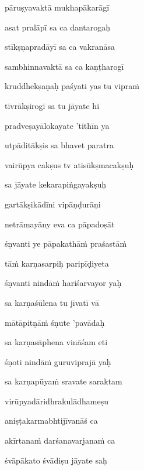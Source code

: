 \nemslokac 
pāruṣyavaktā mukhapākarāgī
\dontdisplaylinenum

\nemslokad 
asat pralāpī sa ca dantarogaḥ \veg\dontdisplaylinenum

\ujvers\nemsloka 
stīkṣṇapradāyī sa ca vakranāsa
\dontdisplaylinenum

\nemslokab 
sambhinnavaktā sa ca kaṇṭharogī \danda\dontdisplaylinenum

\nemslokac 
kruddhekṣaṇaḥ paśyati yas tu vipraṁ
\dontdisplaylinenum

\nemslokad 
tīvrākṣirogī sa tu jāyate hi \veg\dontdisplaylinenum

\ujvers\nemsloka 
pradveṣayālokayate 'tithīn ya
\dontdisplaylinenum

\nemslokab 
utpāditākṣis sa bhavet paratra \danda\dontdisplaylinenum

\nemslokac 
vairūpya cakṣus tv atisūkṣmacakṣuḥ
\dontdisplaylinenum

\nemslokad 
sa jāyate kekarapiṅgayakṣuḥ \veg\dontdisplaylinenum

\ujvers\nemsloka 
gartākṣikādīni vipāṇḍurāṇi
\dontdisplaylinenum

\nemslokab 
netrāmayāny eva ca pāpadoṣāt \danda\dontdisplaylinenum

\nemslokac 
śṇvanti ye pāpakathāṁ praśastāṁ
\dontdisplaylinenum

\nemslokad 
tāṁ karṇasarpiḥ paripīḍiyeta \veg\dontdisplaylinenum

\ujvers\nemsloka 
śṇvanti nindāṁ hariśarvayor yaḥ
\dontdisplaylinenum

\nemslokab 
sa karṇaśūlena tu jīvatī vā \danda\dontdisplaylinenum

\nemslokac 
mātāpitṇāṁ śṇute 'pavādaḥ
\dontdisplaylinenum

\nemslokad 
sa karṇasāphena vināśam eti \veg\dontdisplaylinenum

\ujvers\nemsloka 
śṇoti nindāṁ guruviprajā yaḥ
\dontdisplaylinenum

\nemslokab 
sa karṇapūyaṁ sravate saraktam \danda\dontdisplaylinenum

\nemslokac 
virūpyadāridhrakulādhameṣu
\dontdisplaylinenum

\nemslokad 
aniṣṭakarmabhtijīvanāś ca \veg\dontdisplaylinenum

\ujvers\nemsloka 
akīrtanaṁ darśanavarjanaṁ ca
\dontdisplaylinenum

\nemslokab 
śvāpākato śvādiṣu jāyate saḥ \danda\dontdisplaylinenum

